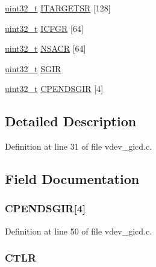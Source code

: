 \begin{DoxyCompactItemize}
\hyperlink{arch__types_8h_a435d1572bf3f880d55459d9805097f62}{uint32\-\_\-t} \hyperlink{structgicd__regs_a4a30dbc1ce8c2c11682ba16ff36f9f16}{\-I\-T\-A\-R\-G\-E\-T\-S\-R} \mbox{[}128\mbox{]}
\item 
\hyperlink{arch__types_8h_a435d1572bf3f880d55459d9805097f62}{uint32\-\_\-t} \hyperlink{structgicd__regs_a01a6b9929552e51bbeabe8dd8311db8f}{\-I\-C\-F\-G\-R} \mbox{[}64\mbox{]}
\item 
\hyperlink{arch__types_8h_a435d1572bf3f880d55459d9805097f62}{uint32\-\_\-t} \hyperlink{structgicd__regs_aed48e259a313de526bb0debcf3a99678}{\-N\-S\-A\-C\-R} \mbox{[}64\mbox{]}
\item 
\hyperlink{arch__types_8h_a435d1572bf3f880d55459d9805097f62}{uint32\-\_\-t} \hyperlink{structgicd__regs_ad468da6adc4ae9617d3b149a7672ac54}{\-S\-G\-I\-R}
\item 
\hyperlink{arch__types_8h_a435d1572bf3f880d55459d9805097f62}{uint32\-\_\-t} \hyperlink{structgicd__regs_a1ec56bb04e487fbeb7a028e75bcb3a8e}{\-C\-P\-E\-N\-D\-S\-G\-I\-R} \mbox{[}4\mbox{]}
\end{DoxyCompactItemize}


\subsection{\-Detailed \-Description}


\-Definition at line 31 of file vdev\-\_\-gicd.\-c.



\subsection{\-Field \-Documentation}
\hypertarget{structgicd__regs_a1ec56bb04e487fbeb7a028e75bcb3a8e}{
\subsubsection[{\-C\-P\-E\-N\-D\-S\-G\-I\-R}]{ {\bf \-C\-P\-E\-N\-D\-S\-G\-I\-R}\mbox{[}4\mbox{]}}}\label{structgicd__regs_a1ec56bb04e487fbeb7a028e75bcb3a8e}


\-Definition at line 50 of file vdev\-\_\-gicd.\-c.

\hypertarget{structgicd__regs_a97a0909f6972748201f6f98fe22122a8}{
\subsubsection[{\-C\-T\-L\-R}]{ {\bf \-C\-T\-L\-R}}}\label{structgicd__regs_a97a0909f6972748201f6f98fe22122a8}


